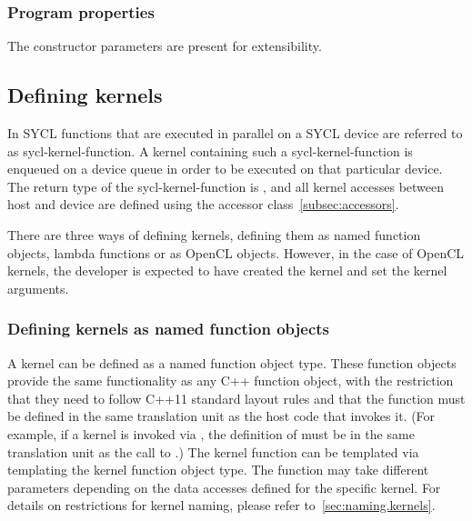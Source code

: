 \subsubsection{Program properties}
\label{sec:interfaces.program.properties}

The  constructor parameters are present for extensibility.

\subsection{Defining kernels}
In SYCL functions that are executed in parallel on a SYCL device are referred to
as \gls{sycl-kernel-function}. A \gls{kernel} containing such a
\gls{sycl-kernel-function} is enqueued on a device queue in order to
be executed on
that particular device. The return type of the \gls{sycl-kernel-function} is
, and all kernel accesses between host and device are defined using the
accessor class~\ref{subsec:accessors}.

There are three ways of defining kernels, defining them as named function objects,
lambda functions or as OpenCL  objects. However, in the case of
OpenCL kernels, the developer is expected to have created the kernel and set the
kernel arguments.

\subsubsection{Defining kernels as named function objects}
\label{sec:interfaces.kernels.as.function-objects}

A kernel can be defined as a named function object type. These function objects
provide the same functionality as any C++ function object, with the
restriction that they need to follow C++11 standard layout rules and that the
 function must be defined in the same translation unit as the
host code that invokes it. (For example, if a kernel is invoked via
, the definition of  must be in the
same translation unit as the call to .)
The kernel function can be templated via templating the kernel
function object type. The  function may take different
parameters depending on the data accesses defined for the
specific kernel. For details on restrictions for kernel naming,
please refer to~\ref{sec:naming.kernels}.

